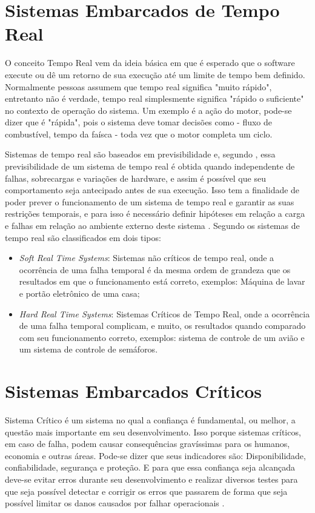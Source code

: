 \section{Sistemas Embarcados de Tempo Real}
\label{sec:sis_embarcados_tempo_real}
O conceito Tempo Real vem da ideia básica em que é esperado que o software execute ou dê um retorno de sua execução até um limite de tempo bem definido. Normalmente pessoas assumem que tempo real significa "muito rápido", entretanto não é verdade, tempo real simplesmente significa "rápido o suficiente" no contexto de operação do sistema. Um exemplo é a ação do motor, pode-se dizer que é "rápida", pois o sistema deve tomar decisões como - fluxo de combustível, tempo da faísca - toda vez que o motor completa um ciclo.

Sistemas de tempo real são baseados em previsibilidade e, segundo \cite{farines2000sistemas}, essa previsibilidade de um sistema de tempo real é obtida quando independente de falhas, sobrecargas e variações de hardware, e assim é possível que seu comportamento seja antecipado antes de sua execução. Isso tem a finalidade de poder prever o funcionamento de um sistema de tempo real e garantir as suas restrições temporais, e para isso é necessário definir hipóteses em relação a carga e falhas em relação ao ambiente externo deste sistema \cite{farines2000sistemas}. 
Segundo \cite{mall2009real} os sistemas de tempo real são classificados em dois tipos:
\begin{itemize}
\item \emph{Soft Real Time Systems}: Sistemas não críticos de tempo real, onde a ocorrência de uma falha temporal é da mesma ordem de grandeza que os resultados em que o funcionamento está correto, exemplos: Máquina de lavar e portão eletrônico de uma casa;
\item \emph{Hard Real Time Systems}: Sistemas Críticos de Tempo Real, onde a ocorrência de uma falha temporal complicam, e muito, os resultados quando comparado com seu funcionamento correto, exemplos: sistema de controle de um avião e um sistema de controle de semáforos.
\end{itemize}

\section{Sistemas Embarcados Críticos}
\label{sec:sis_embarcados_critico}

Sistema Crítico é um sistema no qual a confiança é fundamental, ou melhor, a questão mais importante em seu desenvolvimento. Isso porque sistemas críticos, em caso de falha, podem causar consequências gravíssimas para os humanos, economia e outras áreas. Pode-se dizer que seus indicadores são: Disponibilidade, confiabilidade, segurança e proteção. E para que essa confiança seja alcançada deve-se evitar erros durante seu desenvolvimento e realizar diversos testes para que seja possível detectar e corrigir os erros que passarem de forma que seja possível limitar os danos causados por falhar operacionais \cite{sommerville2004software,feldmann2007survey,jordan2006standard}.


